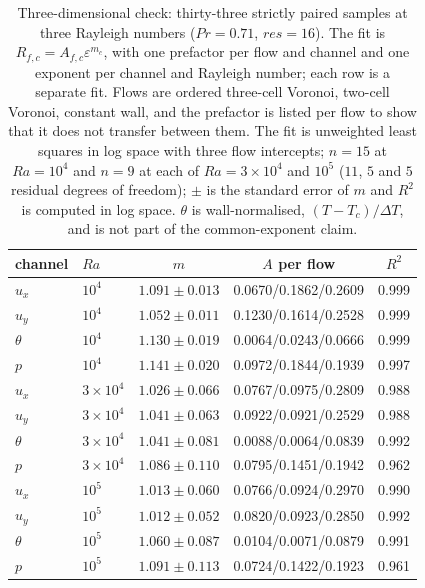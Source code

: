 \documentclass[preprint,11pt,a4paper,times]{elsarticle}
\begin{document}
\begin{table}[htbp]
\centering
\small
\caption{Three-dimensional check: thirty-three strictly paired samples at three Rayleigh numbers
($Pr=0.71$, $res=16$). The fit is $R_{f,c}=A_{f,c}\varepsilon^{m_c}$, with one prefactor per flow and channel and one
exponent per channel and Rayleigh number; each row is a separate fit. Flows are ordered three-cell
Voronoi, two-cell Voronoi, constant wall, and the prefactor is listed per flow to show that it does not transfer between them.
The fit is unweighted least squares in log space with three flow intercepts; $n=15$ at $Ra=10^4$
and $n=9$ at each of $Ra=3\times10^4$ and $10^5$ ($11$, $5$ and $5$ residual degrees of freedom); $\pm$ is the standard
error of $m$ and $R^2$ is computed in log space. $\theta$ is wall-normalised,
$(T-T_c)/\Delta T$, and is not part of the common-exponent claim.}
\label{tab:3d}
\begin{tabular}{@{}llccc@{}}
\toprule
channel & $Ra$ & $m$ & $A$ per flow & $R^2$\\
\midrule
$u_x$ & $10^4$ & $1.091\pm0.013$ & 0.0670/0.1862/0.2609 & 0.999\\
$u_y$ & $10^4$ & $1.052\pm0.011$ & 0.1230/0.1614/0.2528 & 0.999\\
$\theta$ & $10^4$ & $1.130\pm0.019$ & 0.0064/0.0243/0.0666 & 0.999\\
$p$ & $10^4$ & $1.141\pm0.020$ & 0.0972/0.1844/0.1939 & 0.997\\
\midrule
$u_x$ & $3\times10^4$ & $1.026\pm0.066$ & 0.0767/0.0975/0.2809 & 0.988\\
$u_y$ & $3\times10^4$ & $1.041\pm0.063$ & 0.0922/0.0921/0.2529 & 0.988\\
$\theta$ & $3\times10^4$ & $1.041\pm0.081$ & 0.0088/0.0064/0.0839 & 0.992\\
$p$ & $3\times10^4$ & $1.086\pm0.110$ & 0.0795/0.1451/0.1942 & 0.962\\
\midrule
$u_x$ & $10^5$ & $1.013\pm0.060$ & 0.0766/0.0924/0.2970 & 0.990\\
$u_y$ & $10^5$ & $1.012\pm0.052$ & 0.0820/0.0923/0.2850 & 0.992\\
$\theta$ & $10^5$ & $1.060\pm0.087$ & 0.0104/0.0071/0.0879 & 0.991\\
$p$ & $10^5$ & $1.091\pm0.113$ & 0.0724/0.1422/0.1923 & 0.961\\
\bottomrule
\end{tabular}
\end{table}
\end{document}
